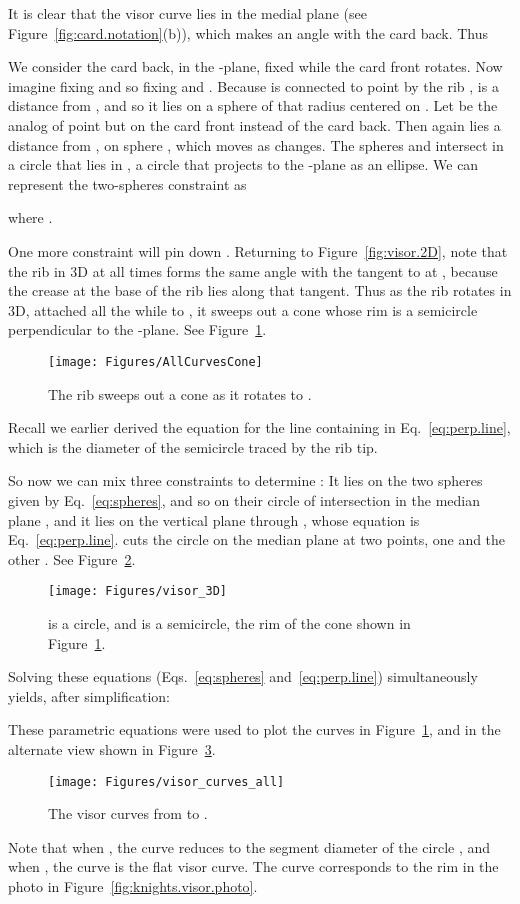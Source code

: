 \pdfoutput=1  \documentclass[]{article}
\newcommand{\figlab}[1]{\label{fig:#1}}
\newcommand{\eqnref}[1]{\ref{eq:#1}}
\newcommand{\figref}[1]{\ref{fig:#1}}
\begin{document}
It is clear that the visor curve lies in the medial plane  (see Figure~\figref{card.notation}(b)), which makes
an angle  with the card back. Thus

We consider the card back, in the -plane, fixed while the card front rotates.
Now imagine fixing  and so fixing  and .
Because  is connected to point  by the rib ,
 is a distance  from , and so it lies on a sphere  of that
radius centered on .
Let  be the analog of point  but on the card front instead of the card back.
Then again  lies a distance  from , on sphere ,
which moves as  changes.
The spheres  and  intersect in a circle that lies in , a circle that projects to the -plane
as an ellipse.
We can represent the two-spheres constraint as

where .

One more constraint will pin down .
Returning to Figure~\figref{visor.2D}, note that the rib in 3D at all times forms the same
angle with the tangent to  at , because the crease at the base of the rib lies along that tangent.
Thus as the rib rotates in 3D, attached all the while to , it sweeps out a cone
whose rim is a semicircle perpendicular to the -plane.
See Figure~\figref{AllCurvesCone}.
\begin{figure}[htbp]
\centering
\texttt{[image: Figures/AllCurvesCone]}
\caption{The rib  sweeps out a cone as it rotates to .}
\figlab{AllCurvesCone}
\end{figure}
Recall we earlier derived the equation for the line containing  in Eq.~\eqnref{perp.line},
which is the diameter of the semicircle traced by the rib tip.

So now we can mix three constraints to determine :
It lies on the two spheres given by Eq.~\eqnref{spheres},
and so on their circle of intersection in the median plane ,
and it lies on the vertical plane  through , whose equation is Eq.~\eqnref{perp.line}.
 cuts the circle on the median plane at two points, one  and the other .
See Figure~\figref{visor.3D}.
\begin{figure}[htbp]
\centering
\texttt{[image: Figures/visor\_3D]}
\caption{ is a circle, and  is a semicircle, the rim of the cone shown in Figure~\protect\figref{AllCurvesCone}.}
\figlab{visor.3D}
\end{figure}



Solving these equations (Eqs.~\eqnref{spheres} and~\eqnref{perp.line}) simultaneously yields,
after simplification:

These parametric equations were used to plot
the curves in Figure~\figref{AllCurvesCone},
and in the alternate view shown in Figure~\figref{visor.curves.all}.
\begin{figure}[htbp]
\centering
\texttt{[image: Figures/visor\_curves\_all]}
\caption{The visor curves from  to .}
\figlab{visor.curves.all}
\end{figure}
Note that when , the curve reduces to the segment diameter of the circle , and when ,
the curve is the flat visor curve.
The  curve corresponds to the rim in the photo in Figure~\figref{knights.visor.photo}.
\end{document}
